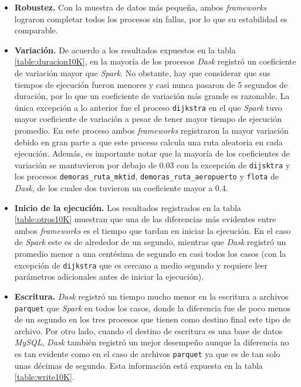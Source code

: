 \begin{itemize}
	
	\item \textbf{Robustez.} Con la muestra de datos más pequeña, ambos \textit{frameworks} lograron completar todos los procesos sin fallas, por lo que su estabilidad es comparable.
	
	\item \textbf{Variación.} De acuerdo a los resultados expuestos en la tabla \ref{table:duracion10K}, en la mayoría de los procesos \textit{Dask} registró un coeficiente de variación mayor que \textit{Spark}. No obstante, hay que considerar que sus tiempos de ejecución fueron menores y casi nunca pasaron de 5 segundos de duración, por lo que un coeficiente de variación más grande es razonable. La única excepción a lo anterior fue el proceso \texttt{dijkstra} en el que \textit{Spark} tuvo mayor coeficiente de variación a pesar de tener mayor tiempo de ejecución promedio. En este proceso ambos \textit{frameworks} registraron la mayor variación debido en gran parte a que este proceso calcula una ruta aleatoria en cada ejecución. Además, es importante notar que la mayoría de los coeficientes de variación se mantuvieron por debajo de 0.03 con la excepción de \texttt{dijsktra} y los procesos \texttt{demoras\_ruta\_mktid}, \texttt{demoras\_ruta\_aeropuerto} y \texttt{flota} de \textit{Dask}, de los cuales dos tuvieron un coeficiente mayor a 0.4.
	
	\item \textbf{Inicio de la ejecución.} Los resultados registrados en la tabla \ref{table:otros10K} muestran que una de las diferencias más evidentes entre ambos \textit{frameworks} es el tiempo que tardan en iniciar la ejecución. En el caso de \textit{Spark} este es de alrededor de un segundo, mientras que \textit{Dask} registró un promedio menor a una centésima de segundo en casi todos los casos (con la excepción de \texttt{dijkstra} que es cercano a medio segundo y requiere leer parámetros adicionales antes de iniciar la ejecución).
	
	\item \textbf{Escritura.} \textit{Dask} registró un tiempo mucho menor en la escritura a archivos \texttt{parquet} que \textit{Spark} en todos los casos, donde la diferencia fue de poco menos de un segundo en los tres procesos que tienen como destino final este tipo de archivo. Por otro lado, cuando el destino de escritura es una base de datos \textit{MySQL}, \textit{Dask} también registró un mejor desempeño aunque la diferencia no es tan evidente como en el caso de archivos \texttt{parquet} ya que es de tan solo unas décimas de segundo. Esta información está expuesta en la tabla \ref{table:write10K}.
	

\end{itemize}

